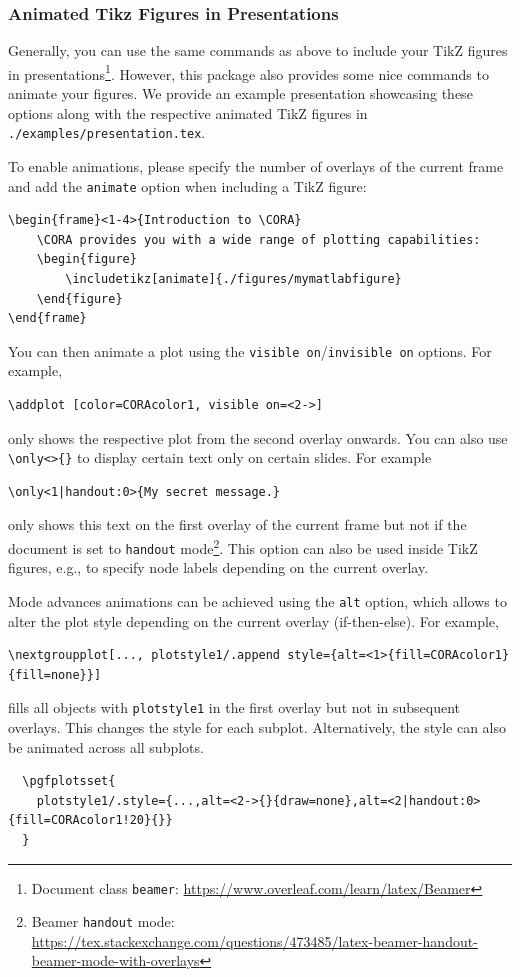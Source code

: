 \documentclass{article}
\begin{document}
\subsubsection{Animated Tikz Figures in Presentations}
Generally, you can use the same commands as above to include your TikZ figures in presentations\footnote{Document class \texttt{beamer}: \url{https://www.overleaf.com/learn/latex/Beamer}}.
However, this package also provides some nice commands to animate your figures.
We provide an example presentation showcasing these options along with the respective animated TikZ figures in \texttt{./examples/presentation.tex}.

To enable animations, please specify the number of overlays of the current frame and add the \texttt{animate} option when including a TikZ figure:
\begin{verbatim}
\begin{frame}<1-4>{Introduction to \CORA}
    \CORA provides you with a wide range of plotting capabilities:
    \begin{figure}
        \includetikz[animate]{./figures/mymatlabfigure}
    \end{figure}
\end{frame}
\end{verbatim}
You can then animate a plot using the \texttt{visible on}/\texttt{invisible on} options. For example,
\begin{verbatim}
\addplot [color=CORAcolor1, visible on=<2->]
\end{verbatim}
only shows the respective plot from the second overlay onwards.
You can also use \verb|\only<>{}| to display certain text only on certain slides.
For example
\begin{verbatim}
\only<1|handout:0>{My secret message.}
\end{verbatim}
only shows this text on the first overlay of the current frame but not if the document is set to \texttt{handout} mode\footnote{Beamer \texttt{handout} mode: \url{https://tex.stackexchange.com/questions/473485/latex-beamer-handout-beamer-mode-with-overlays}}.
This option can also be used inside TikZ figures, e.g., to specify node labels depending on the current overlay.

Mode advances animations can be achieved using the \texttt{alt} option,
which allows to alter the plot style depending on the current overlay (if-then-else).
For example,
\begin{verbatim}
\nextgroupplot[..., plotstyle1/.append style={alt=<1>{fill=CORAcolor1}{fill=none}}]
\end{verbatim}
fills all objects with \texttt{plotstyle1} in the first overlay but not in subsequent overlays.
This changes the style for each subplot. Alternatively, the style can also be animated across all subplots.
\begin{verbatim}
  \pgfplotsset{
    plotstyle1/.style={...,alt=<2->{}{draw=none},alt=<2|handout:0>{fill=CORAcolor1!20}{}}
  }
\end{verbatim}
\end{document}
